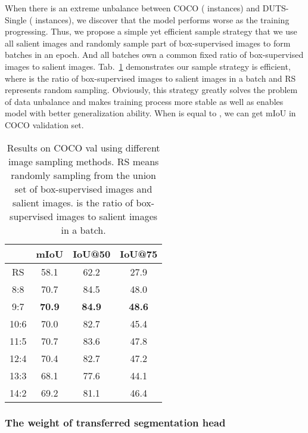 \documentclass[final]{cvpr}
\begin{document}
When there is an extreme unbalance between COCO ( instances) and DUTS-Single ( instances), we discover that the model performs worse as the training progressing. Thus, we propose a simple yet efficient sample strategy that we use all salient images and randomly sample part of box-supervised images to form batches in an epoch. And all batches own a common fixed ratio of box-supervised images to salient images. Tab.~\ref{tab:COCOSampleVal} demonstrates our sample strategy is efficient, where  is the ratio of box-supervised images to salient images in a batch and RS represents random sampling. Obviously, this strategy greatly solves the problem of data unbalance and makes training process more stable as well as enables model with better generalization ability. When  is equal to , we can get  mIoU in COCO validation set.



\begin{table}[htbp]
    \caption{Results on COCO val using different image sampling methods. RS means randomly sampling from the union set of box-supervised images and salient images.  is the ratio of box-supervised images to salient images in a batch.}
    \centering
    \resizebox{0.68\linewidth}{!}
    {
    \begin{tabular}{c|ccc}
        \toprule
         & mIoU  & IoU@50 & IoU@75 \\
        \midrule
RS            & 58.1 & 62.2 & 27.9 \\
        8:8           & 70.7 & 84.5 & 48.0 \\
        9:7           & \textbf{70.9} & \textbf{84.9} & \textbf{48.6} \\
        10:6          & 70.0 & 82.7 & 45.4 \\
        11:5          & 70.7 & 83.6 & 47.8 \\
        12:4          & 70.4 & 82.7 & 47.2 \\
        13:3          & 68.1 & 77.6 & 44.1 \\
        14:2          & 69.2 & 81.1 & 46.4 \\
        \bottomrule
    \end{tabular}
    }
    \label{tab:COCOSampleVal}
\end{table}

\vspace{-3mm}
\subsubsection{The weight of transferred segmentation head}
\vspace{-1mm}
\end{document}
